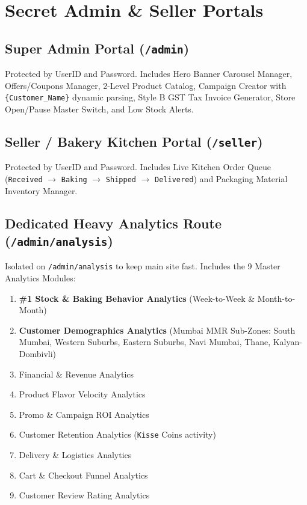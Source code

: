 \documentclass[11pt,a4paper]{article}
\begin{document}
\section{Secret Admin \& Seller Portals}
\subsection{Super Admin Portal (\texttt{/admin})}
Protected by UserID and Password. Includes Hero Banner Carousel Manager, Offers/Coupons Manager, 2-Level Product Catalog, Campaign Creator with \texttt{\{Customer\_Name\}} dynamic parsing, Style B GST Tax Invoice Generator, Store Open/Pause Master Switch, and Low Stock Alerts.

\subsection{Seller / Bakery Kitchen Portal (\texttt{/seller})}
Protected by UserID and Password. Includes Live Kitchen Order Queue (\texttt{Received} $\rightarrow$ \texttt{Baking} $\rightarrow$ \texttt{Shipped} $\rightarrow$ \texttt{Delivered}) and Packaging Material Inventory Manager.

\subsection{Dedicated Heavy Analytics Route (\texttt{/admin/analysis})}
Isolated on \texttt{/admin/analysis} to keep main site fast. Includes the 9 Master Analytics Modules:
\begin{enumerate}
    \item \textbf{\#1 Stock \& Baking Behavior Analytics} (Week-to-Week \& Month-to-Month)
    \item \textbf{Customer Demographics Analytics} (Mumbai MMR Sub-Zones: South Mumbai, Western Suburbs, Eastern Suburbs, Navi Mumbai, Thane, Kalyan-Dombivli)
    \item Financial \& Revenue Analytics
    \item Product Flavor Velocity Analytics
    \item Promo \& Campaign ROI Analytics
    \item Customer Retention Analytics (\texttt{Kisse} Coins activity)
    \item Delivery \& Logistics Analytics
    \item Cart \& Checkout Funnel Analytics
    \item Customer Review Rating Analytics
\end{enumerate}
\end{document}
